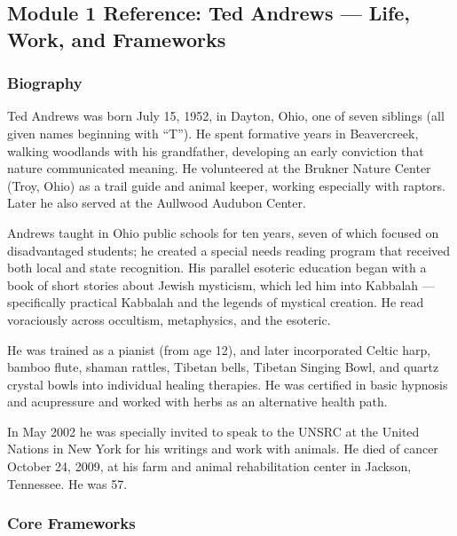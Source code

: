 \documentclass[11pt,letterpaper]{article}
\begin{document}
\subsection{Module 1 Reference: Ted Andrews --- Life, Work, and Frameworks}

\subsubsection{Biography}

Ted Andrews was born July 15, 1952, in Dayton, Ohio, one of seven siblings (all given names beginning with ``T''). He spent formative years in Beavercreek, walking woodlands with his grandfather, developing an early conviction that nature communicated meaning. He volunteered at the Brukner Nature Center (Troy, Ohio) as a trail guide and animal keeper, working especially with raptors. Later he also served at the Aullwood Audubon Center.

Andrews taught in Ohio public schools for ten years, seven of which focused on disadvantaged students; he created a special needs reading program that received both local and state recognition. His parallel esoteric education began with a book of short stories about Jewish mysticism, which led him into Kabbalah --- specifically practical Kabbalah and the legends of mystical creation. He read voraciously across occultism, metaphysics, and the esoteric.

He was trained as a pianist (from age 12), and later incorporated Celtic harp, bamboo flute, shaman rattles, Tibetan bells, Tibetan Singing Bowl, and quartz crystal bowls into individual healing therapies. He was certified in basic hypnosis and acupressure and worked with herbs as an alternative health path.

In May 2002 he was specially invited to speak to the UNSRC at the United Nations in New York for his writings and work with animals. He died of cancer October 24, 2009, at his farm and animal rehabilitation center in Jackson, Tennessee. He was 57.

\subsubsection{Core Frameworks}
\end{document}
